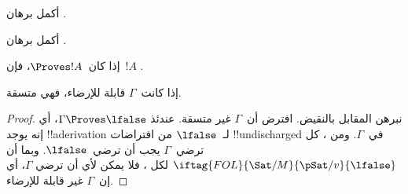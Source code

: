 \documentclass[../../../include/open-logic-section]{subfiles}
\begin{document}
\begin{prob}
أكمل برهان .
\end{prob}
\tagendprob

\begin{prob}
أكمل برهان .
\end{prob}
\tagendprob

\begin{cor}
إذا كان~$\Proves !A$، فإن~$!A$ .
\end{cor}

\begin{cor}
إذا كانت~$\Gamma$ قابلة للإرضاء، فهي متسقة.
\end{cor}

\begin{proof}
نبرهن المقابل بالنقيض. افترض أن~$\Gamma$ غير متسقة. عندئذ
$\Gamma \Proves \lfalse$، أي إنه يوجد !!a{derivation} لـ~$\lfalse$ من
افتراضات !!{undischarged} في~$\Gamma$. ومن ، كل
ترضي~$\Gamma$ يجب أن ترضي~$\lfalse$. وبما أن
$\iftag{FOL}{\Sat/{M}}{\pSat/{v}}{\lfalse}$ لكل
،
فلا يمكن لأي  أن ترضي
$\Gamma$، أي إن~$\Gamma$ غير قابلة للإرضاء.
\end{proof}
\end{document}
